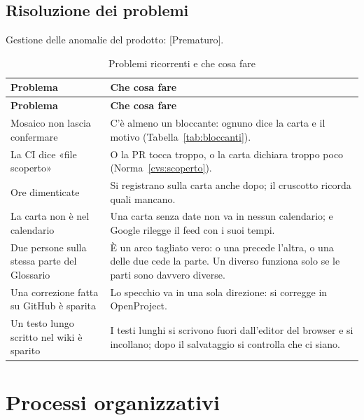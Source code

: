 \documentclass[a4paper, 11pt]{article}
\begin{document}
\subsection{Risoluzione dei problemi}
\begin{norme}
\end{norme}
Gestione delle anomalie del prodotto: [Prematuro].

\begin{xltabular}{\textwidth}{@{} >{\raggedright\arraybackslash}p{0.36\textwidth} X @{}}
\caption{Problemi ricorrenti e che cosa fare}\label{tab:problemi}\\
\toprule
\textbf{Problema} & \textbf{Che cosa fare} \\
\midrule
\endfirsthead
\toprule
\textbf{Problema} & \textbf{Che cosa fare} \\
\midrule
\endhead
Mosaico non lascia confermare & C'è almeno un bloccante: ognuno dice la carta e il motivo (Tabella~\ref{tab:bloccanti}). \\
La CI dice «file scoperto» & O la PR tocca troppo, o la carta dichiara troppo poco (Norma~\ref{cvs:scoperto}). \\
Ore dimenticate & Si registrano sulla carta anche dopo; il cruscotto ricorda quali mancano. \\
La carta non è nel calendario & Una carta senza date non va in nessun calendario; e Google rilegge il feed con i suoi tempi. \\
Due persone sulla stessa parte del Glossario & È un arco tagliato vero: o una precede l'altra, o una delle due cede la parte. Un \cod{\#} diverso funziona solo se le parti sono davvero diverse. \\
Una correzione fatta su GitHub è sparita & Lo specchio va in una sola direzione: si corregge in OpenProject. \\
Un testo lungo scritto nel wiki è sparito & I testi lunghi si scrivono fuori dall'editor del browser e si incollano; dopo il salvataggio si controlla che ci siano. \\
\bottomrule
\end{xltabular}

\section{Processi organizzativi}\label{sec:organizzativi}
\end{document}
